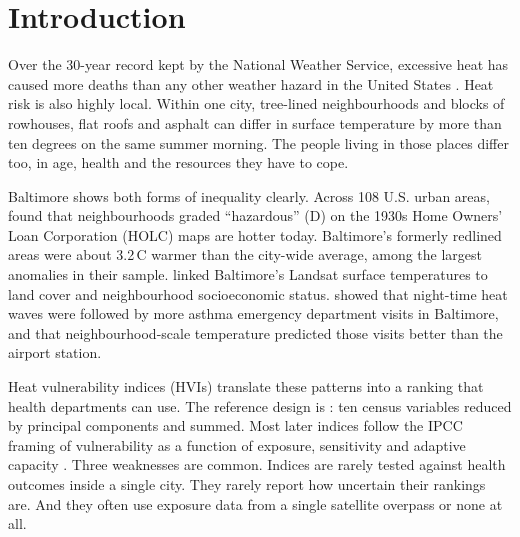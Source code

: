 \documentclass[11pt]{article}
\newcommand{\degC}{\,\textdegree C}
\begin{document}
\section{Introduction}

Over the 30-year record kept by the National Weather Service, excessive heat has caused more deaths than any other weather hazard in the United States \citep{nws}. Heat risk is also highly local. Within one city, tree-lined neighbourhoods and blocks of rowhouses, flat roofs and asphalt can differ in surface temperature by more than ten degrees on the same summer morning. The people living in those places differ too, in age, health and the resources they have to cope.

Baltimore shows both forms of inequality clearly. Across 108 U.S. urban areas, \citet{hoffman2020} found that neighbourhoods graded ``hazardous'' (D) on the 1930s Home Owners' Loan Corporation (HOLC) maps are hotter today. Baltimore's formerly redlined areas were about 3.2\degC{} warmer than the city-wide average, among the largest anomalies in their sample. \citet{huang2011} linked Baltimore's Landsat surface temperatures to land cover and neighbourhood socioeconomic status. \citet{corpuz2026} showed that night-time heat waves were followed by more asthma emergency department visits in Baltimore, and that neighbourhood-scale temperature predicted those visits better than the airport station.

Heat vulnerability indices (HVIs) translate these patterns into a ranking that health departments can use. The reference design is \citet{reid2009}: ten census variables reduced by principal components and summed. Most later indices follow the IPCC framing of vulnerability as a function of exposure, sensitivity and adaptive capacity \citep{ipcc2007}. Three weaknesses are common. Indices are rarely tested against health outcomes inside a single city. They rarely report how uncertain their rankings are. And they often use exposure data from a single satellite overpass or none at all.
\end{document}
